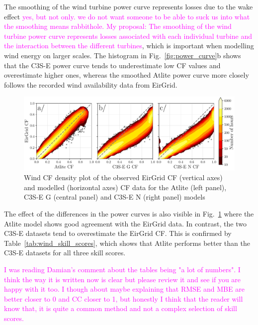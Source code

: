 \documentclass[a4paper, 11pt]{article}
\begin{document}
The smoothing of the wind turbine power curve represents losses due to the wake effect \textcolor{magenta}{yes, but not only. we do not want someone to be able to suck us into what the smoothing means rabbithole. My proposal: The smoothing of the wind turbine power curve represents losses associated with each individual turbine and the interaction between the different turbines}, which is important when modelling wind energy on larger scales. The histogram in Fig.~\ref{fig:power_curve}b shows that the C3S-E power curve tends to underestimate low CF values and overestimate higher ones, whereas the smoothed Atlite power curve more closely follows the recorded wind availability data from EirGrid.

\begin{figure}[!ht]
	\centering
	\includegraphics[width=\textwidth]{verification_wind_contour}
	\caption{Wind CF density plot of the observed EirGrid CF (vertical axes) and modelled (horizontal axes) CF data for the Atlite  (left panel), C3S-E G (central panel) and C3S-E N (right panel) models}
	\label{fig:wind_verification_contour}
\end{figure}

The effect of the differences in the power curves is also visible in Fig.~\ref{fig:wind_verification_contour} where the Atlite model shows good agreement with the EirGrid data. In contrast, the two C3S-E datasets tend to overestimate the EirGrid CF. This is confirmed by Table~\ref{tab:wind_skill_scores}, which shows that Atlite performs better than the C3S-E datasets for all three skill scores. 

\textcolor{magenta}{I was reading Damian's comment about the tables being "a lot of numbers". I think the way it is written now is clear but please review it and see if you are happy with it too. I though about maybe explaining that RMSE and MBE are better closer to 0 and CC closer to 1, but honestly I think that the reader will know that, it is quite a common method and not a complex selection of skill scores.}
\end{document}

